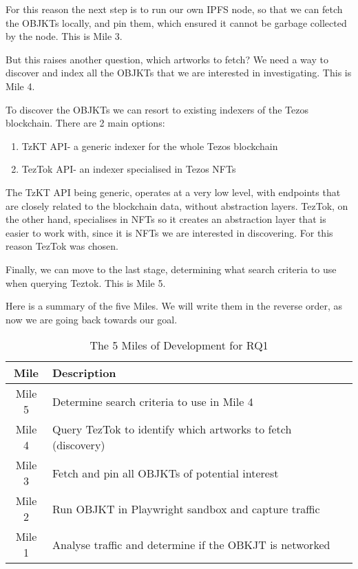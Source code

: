 For this reason the next step is to run our own IPFS node, so that we can fetch the OBJKTs locally, and pin them, which ensured it cannot be garbage collected by the node. This is Mile 3.

But this raises another question, which artworks to fetch? We need a way to discover and index all the OBJKTs that we are interested in investigating. This is Mile 4.

To discover the OBJKTs we can resort to existing indexers of the Tezos blockchain. There are 2 main options:

\begin{enumerate}
	\item TzKT API\footnotemark[5] - a generic indexer for the whole Tezos blockchain
	\item TezTok API\footnotemark[6] - an indexer specialised in Tezos NFTs
\end{enumerate}


The TzKT API being generic, operates at a very low level, with endpoints that are closely related to the blockchain data, without abstraction layers.
TezTok, on the other hand, specialises in NFTs so it creates an abstraction layer that is easier to work with, since it is NFTs we are interested in discovering. For this reason TezTok was chosen.

Finally, we can move to the last stage, determining what search criteria to use when querying Teztok. This is Mile 5.

Here is a summary of the five Miles. We will write them in the reverse order, as now we are going back towards our goal.

\vspace{0.5cm}

\begin{table}[h]
\footnotesize
\centering
\begin{tabular}{|c|p{10cm}|}
\hline
\textbf{Mile} & \textbf{Description} \\ \hline
Mile 5 & Determine search criteria to use in Mile 4 \\ \hline
Mile 4 & Query TezTok to identify which artworks to fetch (discovery) \\ \hline
Mile 3 & Fetch and pin all OBJKTs of potential interest \\ \hline
Mile 2 & Run OBJKT in Playwright sandbox and capture traffic \\ \hline
Mile 1 & Analyse traffic and determine if the OBKJT is networked \\ \hline
\end{tabular}
\caption{The 5 Miles of Development for RQ1}
\end{table}

